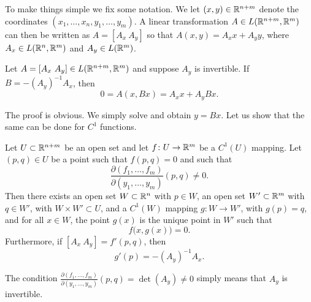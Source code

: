 To make things simple we fix some notation.  We let $(x,y) \in
{\mathbb{R}}^{n+m}$ denote the coordinates $(x_1,\ldots,x_n,y_1,\ldots,y_m)$.  A
linear transformation $A \in L({\mathbb{R}}^{n+m},{\mathbb{R}}^m)$ can then 
be written as
$A = [ A_x ~ A_y ]$ so that $A(x,y) = A_x x + A_y y$,
where $A_x \in L({\mathbb{R}}^n,{\mathbb{R}}^m)$ and
$A_y \in L({\mathbb{R}}^m)$.

\begin{prop}
Let $A = [A_x~A_y] \in L({\mathbb{R}}^{n+m},{\mathbb{R}}^m)$ and suppose 
$A_y$ is invertible.  If $B = - {(A_y)}^{-1} A_x$, then
\begin{equation*}
0 = A ( x, Bx) = A_x x + A_y Bx .
\end{equation*}
\end{prop}

The proof is obvious.  We simply solve and obtain $y = Bx$.  Let us
show that the same can be done for $C^1$ functions.

\begin{thm}
\label{thm:implicit}
Let $U \subset {\mathbb{R}}^{n+m}$ be an open set and let $f \colon U \to {\mathbb{R}}^m$
be a $C^1(U)$ mapping.  Let $(p,q) \in U$ be a point such that
$f(p,q) = 0$ and such that
\begin{equation*}
\frac{\partial(f_1,\ldots,f_m)}{\partial(y_1,\ldots,y_m)} (p,q)  \neq 0 .
\end{equation*}
Then there exists an
open set $W \subset {\mathbb{R}}^n$ with $p \in W$,
an open set $W' \subset {\mathbb{R}}^m$ with $q \in W'$,
with $W \times W' \subset U$,
and
a $C^1(W)$ mapping $g \colon W \to W'$, with $g(p) = q$, and
for all $x \in W$, the point $g(x)$ is the unique point in $W'$
such that 
\begin{equation*}
f\bigl(x,g(x)\bigr) = 0 .
\end{equation*}
Furthermore, if $[ A_x ~ A_y ] = f'(p,q)$, then
\begin{equation*}
g'(p) = -{(A_y)}^{-1}A_x .
\end{equation*}
\end{thm}

The condition
$\frac{\partial(f_1,\ldots,f_m)}{\partial(y_1,\ldots,y_m)} (p,q) =
\det(A_y)  \neq 0$
simply means that $A_y$ is invertible.

